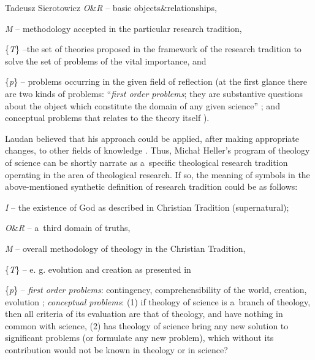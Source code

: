 \begin{artengenv}{Tadeusz Sierotowicz}
\textit{O}\&\textit{R} -- basic objects\&relationships,



\textit{M} -- methodology accepted in the particular research tradition,



\{\textit{T}\} –the set of theories proposed in the framework of the research tradition to solve the set of problems of the vital importance, and



\{\textit{p}\} -- problems occurring in the given field of reflection (at the first glance there are two kinds of problems: ``\textit{first order problems}; they are substantive questions about the object which constitute the domain of any given science'' 
\parencite[][p.15, Laudan's italics]{laudan_progress_1977}; %
 and conceptual problems that relates to the theory itself 
\parencite[][chap.2]{laudan_progress_1977}%
).



Laudan believed that his approach could be applied, after making appropriate changes, to other fields of knowledge 
\parencite[][pp.189–192]{laudan_progress_1977}. %
 Thus, Michał Heller's program of theology of science can be shortly narrate as a~specific theological research tradition operating in the area of theological research. If so, the meaning of symbols in the above-mentioned synthetic definition of research tradition could be as follows:



\textit{I} -- the existence of God as described in Christian Tradition (supernatural);



\textit{O}\&\textit{R} -- a~third domain of truths,



\textit{M} -- overall methodology of theology in the Christian Tradition,



\{\textit{T}\} -- e. g. evolution and creation as presented in
\parencite[][pp.81–103]{heller_new_1996}



\{\textit{p}\} -- \textit{first order problems}: contingency, comprehensibility of the world, creation, evolution 
\parencite[for a~more detailed compilation, see:][pp.67–137]{macek_teologia_2014}; %
 \textit{conceptual problems}: (1) if theology of science is a~branch of theology, then all criteria of its evaluation are that of theology, and have nothing in common with science, (2) has theology of science bring any new solution to significant problems (or formulate any new problem), which without its contribution would not be known in theology or in science?




\end{artengenv}
